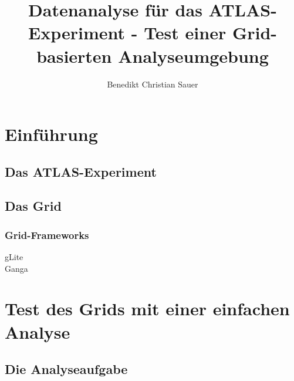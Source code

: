 \documentclass{scrartcl}
\author{Benedikt Christian Sauer}
\title{Datenanalyse für das ATLAS-Experiment - Test einer Grid-basierten
Analyseumgebung}
\begin{document}
\section{Einführung}
\subsection{Das ATLAS-Experiment}
\subsection{Das Grid}
\subsubsection{Grid-Frameworks}
\begin{description}
    \item[gLite]
    \item[Ganga]
\end{description}

\section{Test des Grids mit einer einfachen Analyse}
\subsection{Die Analyseaufgabe}
\end{document}
